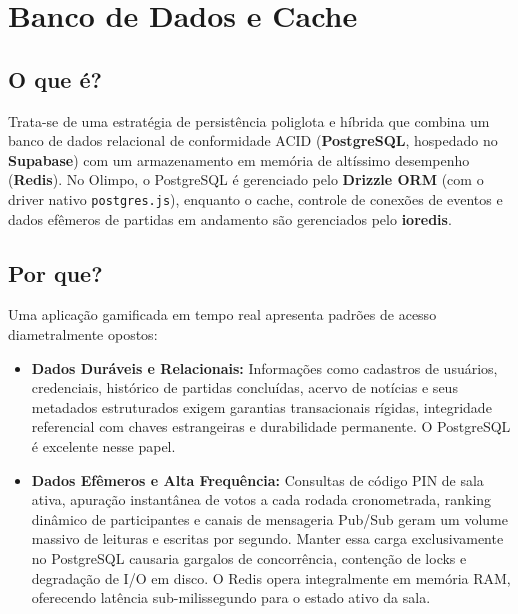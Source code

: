 \documentclass[12pt,a4paper]{article}
\begin{document}
\section{Banco de Dados e Cache}

\subsection{O que é?}
Trata-se de uma estratégia de persistência poliglota e híbrida que combina um banco de dados relacional de conformidade ACID (\textbf{PostgreSQL}, hospedado no \textbf{Supabase}) com um armazenamento em memória de altíssimo desempenho (\textbf{Redis}). No Olimpo, o PostgreSQL é gerenciado pelo \textbf{Drizzle ORM} (com o driver nativo \texttt{postgres.js}), enquanto o cache, controle de conexões de eventos e dados efêmeros de partidas em andamento são gerenciados pelo \textbf{ioredis}.

\subsection{Por que?}
Uma aplicação gamificada em tempo real apresenta padrões de acesso diametralmente opostos:
\begin{itemize}
  \item \textbf{Dados Duráveis e Relacionais:} Informações como cadastros de usuários, credenciais, histórico de partidas concluídas, acervo de notícias e seus metadados estruturados exigem garantias transacionais rígidas, integridade referencial com chaves estrangeiras e durabilidade permanente. O PostgreSQL é excelente nesse papel.
  \item \textbf{Dados Efêmeros e Alta Frequência:} Consultas de código PIN de sala ativa, apuração instantânea de votos a cada rodada cronometrada, ranking dinâmico de participantes e canais de mensageria Pub/Sub geram um volume massivo de leituras e escritas por segundo. Manter essa carga exclusivamente no PostgreSQL causaria gargalos de concorrência, contenção de locks e degradação de I/O em disco. O Redis opera integralmente em memória RAM, oferecendo latência sub-milissegundo para o estado ativo da sala.
\end{itemize}
\end{document}
